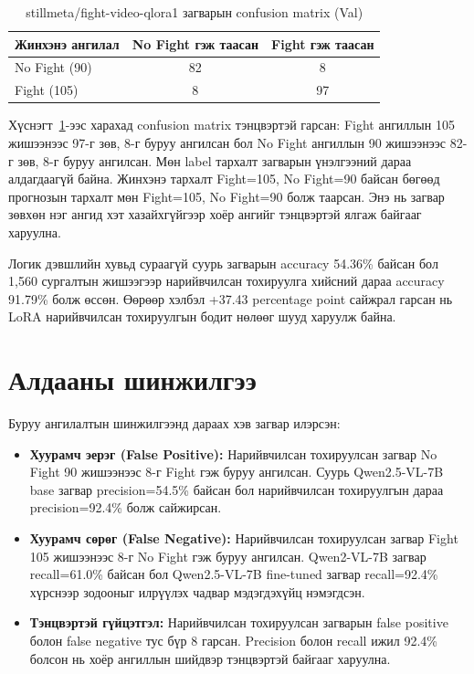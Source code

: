 \begin{table}[htbp]
\centering
\caption{stillmeta/fight-video-qlora1 загварын confusion matrix (Val)}
\label{tab:stillmeta_confusion_matrix}
\begin{tabular}{lcc}
\hline
\textbf{Жинхэнэ ангилал} & \textbf{No Fight гэж таасан} & \textbf{Fight гэж таасан} \\
\hline
No Fight (90) & 82 & 8 \\
Fight (105)   & 8  & 97 \\
\hline
\end{tabular}
\end{table}

Хүснэгт~\ref{tab:stillmeta_confusion_matrix}-ээс харахад confusion matrix тэнцвэртэй гарсан: Fight ангиллын 105 жишээнээс 97-г зөв, 8-г буруу ангилсан бол No Fight ангиллын 90 жишээнээс 82-г зөв, 8-г буруу ангилсан. Мөн label тархалт загварын үнэлгээний дараа алдагдаагүй байна. Жинхэнэ тархалт Fight=105, No Fight=90 байсан бөгөөд прогнозын тархалт мөн Fight=105, No Fight=90 болж таарсан. Энэ нь загвар зөвхөн нэг ангид хэт хазайхгүйгээр хоёр ангийг тэнцвэртэй ялгаж байгааг харуулна.

Логик дэвшлийн хувьд сураагүй суурь загварын accuracy 54.36\% байсан бол 1,560 сургалтын жишээгээр нарийвчилсан тохируулга хийсний дараа accuracy 91.79\% болж өссөн. Өөрөөр хэлбэл +37.43 percentage point сайжрал гарсан нь LoRA нарийвчилсан тохируулгын бодит нөлөөг шууд харуулж байна.

\section{Алдааны шинжилгээ}

Буруу ангилалтын шинжилгээнд дараах хэв загвар илэрсэн:

\begin{itemize}
    \item \textbf{Хуурамч эерэг (False Positive):} Нарийвчилсан тохируулсан загвар No Fight 90 жишээнээс 8-г Fight гэж буруу ангилсан. Суурь Qwen2.5-VL-7B base загвар precision=54.5\% байсан бол нарийвчилсан тохируулгын дараа precision=92.4\% болж сайжирсан.

    \item \textbf{Хуурамч сөрөг (False Negative):} Нарийвчилсан тохируулсан загвар Fight 105 жишээнээс 8-г No Fight гэж буруу ангилсан. Qwen2-VL-7B загвар recall=61.0\% байсан бол Qwen2.5-VL-7B fine-tuned загвар recall=92.4\% хүрснээр зодооныг илрүүлэх чадвар мэдэгдэхүйц нэмэгдсэн.

    \item \textbf{Тэнцвэртэй гүйцэтгэл:} Нарийвчилсан тохируулсан загварын false positive болон false negative тус бүр 8 гарсан. Precision болон recall ижил 92.4\% болсон нь хоёр ангиллын шийдвэр тэнцвэртэй байгааг харуулна.
\end{itemize}

